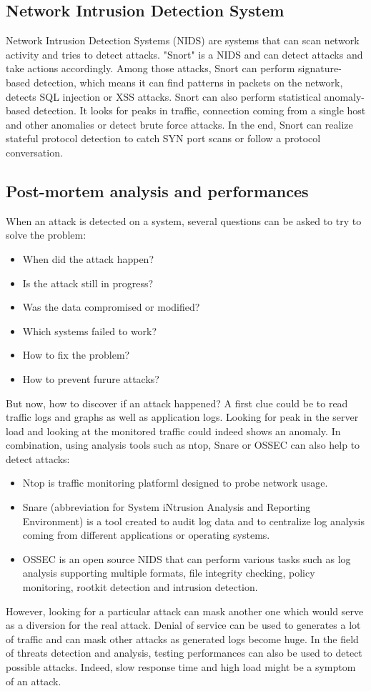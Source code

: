 \subsection{Network Intrusion Detection System}
Network Intrusion Detection Systems (NIDS) are systems that can scan network
activity and tries to detect attacks. "Snort" is a NIDS and can detect attacks
and take actions accordingly. Among those attacks, Snort can perform
signature-based detection, which means it can find patterns in packets on the
network, detects SQL injection or XSS attacks. Snort can also perform
statistical anomaly-based detection. It looks for peaks in traffic, connection
coming from a single host and other anomalies or detect brute force attacks. In
the end, Snort can realize stateful protocol detection to catch SYN port scans
or follow a protocol conversation.

\subsection{Post-mortem analysis and performances}
When an attack is detected on a system, several questions can be asked to try
to solve the problem:
\begin{itemize}{}
\item When did the attack happen?
\item Is the attack still in progress?
\item Was the data compromised or modified?
\item Which systems failed to work?
\item How to fix the problem?
\item How to prevent furure attacks?
\end{itemize}

But now, how to discover if an attack happened? A first clue could be to read
traffic logs and graphs as well as application logs. Looking for peak in the
server load and looking at the monitored traffic could indeed shows an anomaly.
In combination, using analysis tools such as ntop, Snare or OSSEC can also help
to detect attacks: \begin{itemize}{} \renewcommand{\labelitemi}{$\circ$} \item
Ntop is traffic monitoring platforml designed to probe network usage. \item
Snare (abbreviation for System iNtrusion Analysis and Reporting Environment) is
a tool created to audit log data and to centralize log analysis coming from
different applications or operating systems. \item OSSEC is an open source NIDS
that can perform various tasks such as log analysis supporting multiple formats,
file integrity checking, policy monitoring, rootkit detection and intrusion
detection. \end{itemize}

However, looking for a particular attack can mask another one which would serve
as a diversion for the real attack. Denial of service can be used to generates a
lot of traffic and can mask other attacks as generated logs become huge. In the
field of threats detection and analysis, testing performances can also be used
to detect possible attacks. Indeed, slow response time and high load might be a
symptom of an attack.
